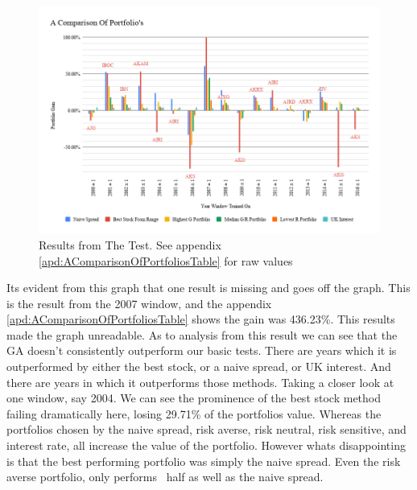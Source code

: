 \documentclass[11pt]{article}
\begin{document}
    \begin{figure}[H] %
        \includegraphics[width=\textwidth]{AComparisonOfPortfolios}
        \caption{Results from The Test. See appendix \ref{apd:AComparisonOfPortfoliosTable} for raw values}
            \label{fig:AComparisonOfPortfolios}
    \end{figure}

    Its evident from this graph that one result is missing and goes off the graph. This
    is the result from the 2007 window, and the appendix \ref{apd:AComparisonOfPortfoliosTable}
    shows the gain was 436.23\%. This results made the graph unreadable. As to analysis
    from this result we can see that the GA doesn't consistently outperform our basic
    tests. There are years which it is outperformed by either the best stock, or a naive
    spread, or UK interest. And there are years in which it outperforms those methods.
    Taking a closer
    look at one window, say 2004. We can see the prominence of the best stock method
    failing dramatically here, losing 29.71\% of the portfolios value. Whereas
    the portfolios chosen by the naive spread, risk averse, risk neutral, risk
    sensitive, and interest rate, all increase the value of the portfolio. However
    whats disappointing is that the best performing portfolio was simply the naive spread.
    Even the risk averse portfolio, only performs ~half as well as the naive spread.
\end{document}
